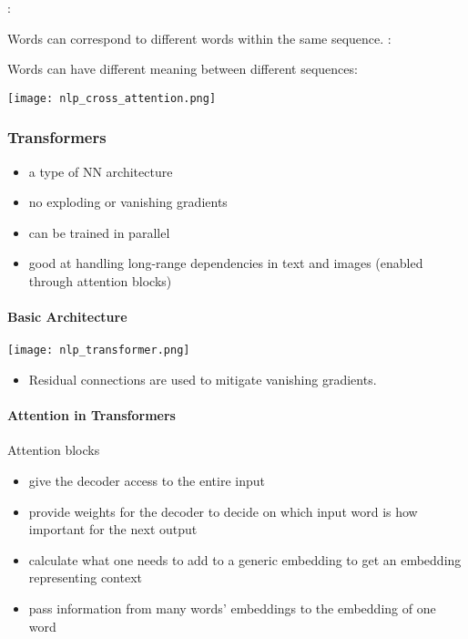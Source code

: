 :

Words can correspond to different words within the same sequence.
\newpar{}
:

Words can have different meaning between different sequences:

\begin{center}
    \texttt{[image: nlp\_cross\_attention.png]}
\end{center}

\subsubsection{Transformers}
\newpar{}
\begin{itemize}
    \item a type of NN architecture
    \item no exploding or vanishing gradients
    \item can be trained in parallel
    \item good at handling long-range dependencies in text and images (enabled through attention blocks)
\end{itemize}
\paragraph{Basic Architecture}
\begin{center}
    \texttt{[image: nlp\_transformer.png]}
\end{center}

\newpar{}
\begin{itemize}
    \item Residual connections are used to mitigate vanishing gradients.
\end{itemize}

\paragraph{Attention in Transformers}
\newpar{}
Attention blocks
\begin{itemize}
    \item give the decoder access to the entire input 
    \item provide weights for the decoder to decide on which input word is how important for the next output
    \item calculate what one needs to add to a generic embedding to get an embedding representing context
    \item pass information from many words' embeddings to the embedding of one word
\end{itemize}

